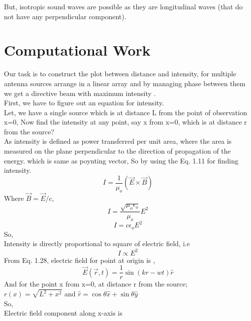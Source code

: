 But, isotropic sound waves are possible as they are longitudinal waves (that do not have any perpendicular component).

\section{Computational Work}
Our task is to construct the plot between distance and intensity, for multiple antenna sources arrange in a linear array and by managing phase between them we get a directive beam with maximum intensity .\\
First, we have to figure out an equation for intensity.\\
Let, we have a single source which is at distance L from the point of observation x=0, Now find the intensity at any point, say x from x=0, which is at distance r from the source?\\
As intensity is defined as power transferred per unit area, where the area is measured on the plane perpendicular to the direction of propagation of the energy. which is same as poynting vector, So by using the Eq. 1.11 for finding intensity.\\
\begin{equation}
I = \frac{1}{\mu_{o}}(\vec{E}\times\vec{B})
\end{equation}
Where $\vec{B} = \vec{E}/c$,\\
\begin{equation}
I = \frac{\sqrt{\mu_{o}{\epsilon_{o}}}}{\mu_{o}}E^2
\end{equation}
\begin{equation}
I = c\epsilon_{o}E^2
\end{equation}
So,\\
Intensity is directly proportional to square of electric field, i.e\\
\begin{equation}
I \propto E^2
\end{equation}
From Eq. 1.28, electric field for point at origin is ,\\
\begin{equation}
\vec{E}(\vec{r},t) = \frac{1}{r}\sin(kr-wt)\hat{r}
\end{equation}
And for the point x from x=0, at distance r from the source;\\
$r(x) = \sqrt{L^2+x^2}$ and $\hat{r} = \cos\theta\hat{x}+\sin\theta\hat{y}$\\
So,\\
Electric field component along x-axis is\\
